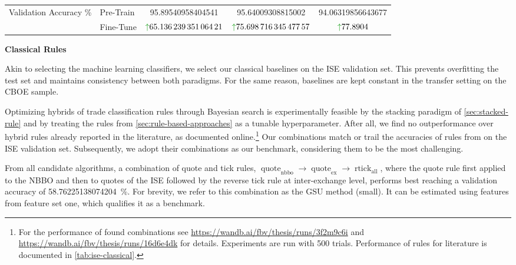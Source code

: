 \begin{table}[!h]
\begin{tabular}{@{}llSSS@{}}
        Validation Accuracy \%               & Pre-Train                                           & {\num{95.89540958404541}}                                  & {\num{95.64009308815002}}                                   & {\num{94.06319856643677}}                         \\
                                             & Fine-Tune                                           & {$\textcolor{viz-green}{\uparrow}\num{65.13623935106421}$} & {$\textcolor{viz-green}{\uparrow} \num{75.69871634547757}$} & {$\textcolor{viz-green}{\uparrow} \num{77.8904}$} \\ \bottomrule
    \end{tabular}
\end{table}

\textbf{Classical Rules}

Akin to selecting the machine learning classifiers, we select our classical baselines on the \gls{ISE} validation set. This prevents \gls{overfitting} the test set and maintains consistency between both paradigms. For the same reason, baselines are kept constant in the transfer setting on the \gls{CBOE} sample.

Optimizing hybrids of trade classification rules through Bayesian search is experimentally feasible by the stacking paradigm of \cref{sec:stacked-rule} and by treating the rules from \cref{sec:rule-based-approaches} as a tunable hyperparameter. After all, we find no outperformance over hybrid rules already reported in the literature, as documented online.\footnote{For the performance of found combinations see \url{https://wandb.ai/fbv/thesis/runs/3f2m9c6i} and \url{https://wandb.ai/fbv/thesis/runs/16d6e4dk} for details. Experiments are run with \num{500} trials. Performance of rules for literature is documented in \cref{tab:ise-classical}.} Our combinations match or trail the accuracies of rules from \textcite[\checkmark][13--15]{grauerOptionTradeClassification2022} on the \gls{ISE} validation set. Subsequently, we adopt their combinations as our benchmark, considering them to be the most challenging.

From all candidate algorithms, a combination of quote and tick rules, $\operatorname{quote}_{\mathrm{nbbo}} \to \operatorname{quote}_{\mathrm{ex}} \to \operatorname{rtick}_{\mathrm{all}}$, where the quote rule first applied to the \gls{NBBO} and then to quotes of the \gls{ISE} followed by the reverse tick rule at inter-exchange level, performs best reaching a validation accuracy of \SI{58.76225138074204}{\percent}. For brevity, we refer to this combination as the \gls{GSU} method (small). It can be estimated using features from feature set one, which qualifies it as a benchmark.


